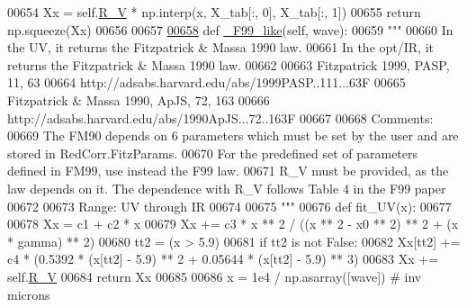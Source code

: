 \begin{DoxyCode}
{00654         Xx = self.\hyperlink{classpyneb_1_1extinction_1_1red__corr_1_1_red_corr_a4696ecdd84c912c20e6aa19b1573e875}{R\_V} * np.interp(x, X\_tab[:, 0], X\_tab[:, 1])
00655         \textcolor{keywordflow}{return} np.squeeze(Xx)
00656     
00657     
\hypertarget{red__corr_8py_source_l00658}{}\hyperlink{classpyneb_1_1extinction_1_1red__corr_1_1_red_corr_afa769aa42ed7d39fb04fd36fda88b54e}{00658}     \textcolor{keyword}{def }\hyperlink{classpyneb_1_1extinction_1_1red__corr_1_1_red_corr_afa769aa42ed7d39fb04fd36fda88b54e}{\_F99\_like}(self, wave):
00659         \textcolor{stringliteral}{"""}
00660 \textcolor{stringliteral}{        In the UV, it returns the Fitzpatrick & Massa 1990 law.}
00661 \textcolor{stringliteral}{        In the opt/IR, it returns the Fitzpatrick & Massa 1990 law. }
00662 \textcolor{stringliteral}{        }
00663 \textcolor{stringliteral}{        Fitzpatrick 1999, PASP, 11, 63}
00664 \textcolor{stringliteral}{        http://adsabs.harvard.edu/abs/1999PASP..111...63F}
00665 \textcolor{stringliteral}{        Fitzpatrick & Massa 1990, ApJS, 72, 163}
00666 \textcolor{stringliteral}{        http://adsabs.harvard.edu/abs/1990ApJS...72..163F}
00667 \textcolor{stringliteral}{        }
00668 \textcolor{stringliteral}{        Comments:}
00669 \textcolor{stringliteral}{        The FM90 depends on 6 parameters which must be set by the user and are stored in
       RedCorr.FitzParams.}
00670 \textcolor{stringliteral}{        For the predefined set of parameters defined in FM99, use instead the F99 law.}
00671 \textcolor{stringliteral}{        R\_V must be provided, as the law depends on it. The dependence with R\_V follows Table 4 in the F99
       paper }
00672 \textcolor{stringliteral}{}
00673 \textcolor{stringliteral}{        Range: UV through IR}
00674 \textcolor{stringliteral}{        }
00675 \textcolor{stringliteral}{        """}
00676         \textcolor{keyword}{def }fit\_UV(x):
00677 
00678             Xx = c1 + c2 * x
00679             Xx += c3 * x ** 2 / ((x ** 2 - x0 ** 2) ** 2 + (x * gamma) ** 2)
00680             tt2 = (x > 5.9) 
00681             \textcolor{keywordflow}{if} tt2 \textcolor{keywordflow}{is} \textcolor{keywordflow}{not} \textcolor{keyword}{False}:
00682                 Xx[tt2] += c4 * (0.5392 * (x[tt2] - 5.9) ** 2 + 0.05644 * (x[tt2] - 5.9) ** 3)
00683             Xx += self.\hyperlink{classpyneb_1_1extinction_1_1red__corr_1_1_red_corr_a4696ecdd84c912c20e6aa19b1573e875}{R\_V}
00684             \textcolor{keywordflow}{return} Xx
00685             
00686         x = 1e4 / np.asarray([wave]) \textcolor{comment}{# inv microns}
}
\end{DoxyCode}
